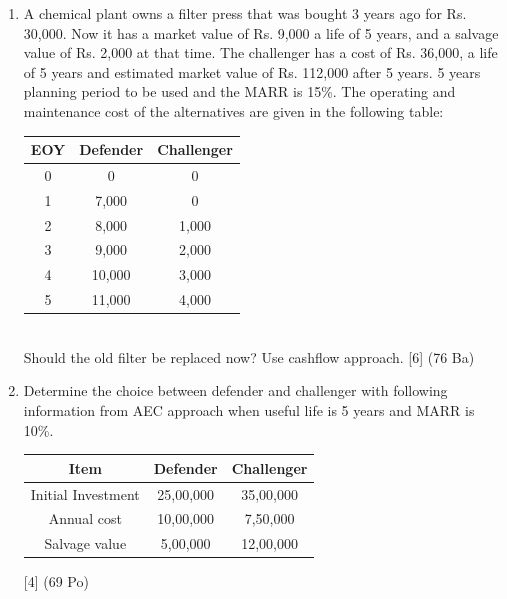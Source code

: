 \documentclass[12pt]{article}
\begin{document}
\begin{enumerate}
				\item A chemical plant owns a filter press that was bought 3 years ago for Rs. 30,000. Now it has a market value of Rs. 9,000 a life of 5 years, and a salvage value of Rs. 2,000 at that time. The challenger has a cost of Rs. 36,000, a life of 5 years and estimated market value of Rs. 112,000 after 5 years. 5 years planning period to be used and the MARR is 15\%. The operating and maintenance cost of the alternatives are given in the following table: \\
				\begin{tabular}{|c|c|c|}
					\hline
					EOY & Defender & Challenger \\ \hline
					0 & 0 & 0 \\ \hline
					1 & 7,000 & 0 \\ \hline
					2 & 8,000 & 1,000 \\ \hline
					3 & 9,000 & 2,000 \\ \hline
					4 & 10,000 & 3,000 \\ \hline
					5 & 11,000 & 4,000 \\ \hline
				\end{tabular}\\
				Should the old filter be replaced now? Use cashflow approach. \hfill [6] (76 Ba)

				\item Determine the choice between defender and challenger with following information from AEC approach when useful life is 5 years and MARR is 10\%. \\ 
				\begin{tabular}{|c|c|c|}
					\hline
					Item & Defender & Challenger \\ \hline
					Initial Investment & 25,00,000 & 35,00,000 \\ \hline
					Annual cost & 10,00,000 & 7,50,000 \\ \hline
					Salvage value & 5,00,000 & 12,00,000 \\ \hline
				\end{tabular} \hfill [4] (69 Po)
			\end{enumerate}
\end{document}
